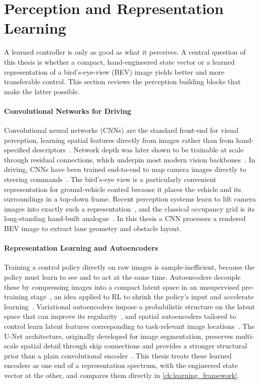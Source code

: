 \section{Perception and Representation Learning}

A learned controller is only as good as what it perceives. A central question of this thesis is whether a compact, hand-engineered state vector or a learned representation of a bird's-eye-view (BEV) image yields better and more transferable control. This section reviews the perception building blocks that make the latter possible.

\paragraph{Convolutional Networks for Driving}
Convolutional neural networks (CNNs) are the standard front-end for visual perception, learning spatial features directly from images rather than from hand-specified descriptors~\cite{lecun1998gradient, krizhevsky2012alexnet}. Network depth was later shown to be trainable at scale through residual connections, which underpin most modern vision backbones~\cite{he2016resnet}. In driving, CNNs have been trained end-to-end to map camera images directly to steering commands~\cite{bojarski2016end}. The bird's-eye view is a particularly convenient representation for ground-vehicle control because it places the vehicle and its surroundings in a top-down frame. Recent perception systems learn to lift camera images into exactly such a representation~\cite{philion2020lss}, and the classical occupancy grid is its long-standing hand-built analogue~\cite{elfes1989occupancy}. In this thesis a CNN processes a rendered BEV image to extract lane geometry and obstacle layout.

\paragraph{Representation Learning and Autoencoders}
Training a control policy directly on raw images is sample-inefficient, because the policy must learn to see and to act at the same time. Autoencoders decouple these by compressing images into a compact latent space in an unsupervised pre-training stage~\cite{hinton2006reducing}, an idea applied to RL to shrink the policy's input and accelerate learning~\cite{lange2010deep}. Variational autoencoders impose a probabilistic structure on the latent space that can improve its regularity~\cite{kingma2014vae}, and spatial autoencoders tailored to control learn latent features corresponding to task-relevant image locations~\cite{finn2016spatial}. The U-Net architecture, originally developed for image segmentation, preserves multi-scale spatial detail through skip connections and provides a stronger structural prior than a plain convolutional encoder~\cite{ronneberger2015unet}. This thesis treats these learned encoders as one end of a representation spectrum, with the engineered state vector at the other, and compares them directly in \cref{ch:learning_framework}.

